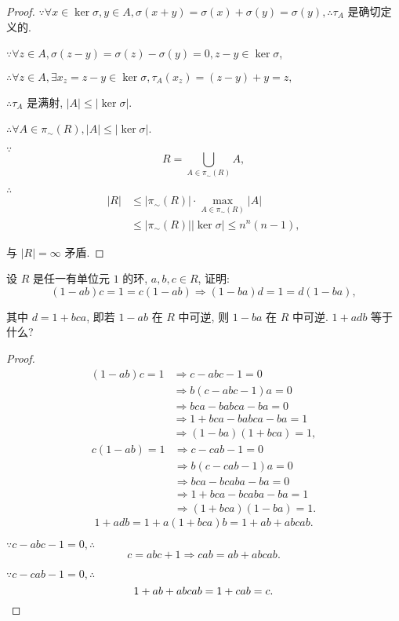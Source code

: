 \documentclass{ctexart}
\begin{document}
\begin{proof}
    $\because\forall x\in\ker\sigma,y\in A,\sigma(x+y)=\sigma(x)+\sigma(y)=\sigma(y),\therefore\tau_A$ 是确切定义的.

    $\because\forall z\in A,\sigma(z-y)=\sigma(z)-\sigma(y)=0,z-y\in\ker\sigma$,

    $\therefore\forall z\in A,\exists x_z=z-y\in\ker\sigma,\tau_A(x_z)=(z-y)+y=z,$

    $\therefore\tau_A$ 是满射, $|A|\leq|\ker\sigma|$.

    $\therefore\forall A\in\pi_\sim(R),|A|\leq|\ker\sigma|$.

    $\because$
    \[R=\bigcup\limits_{A\in\pi_\sim(R)}A,\]

    $\therefore$
    \begin{align*}
        |R| & \leq|\pi_\sim(R)|\cdot\max\limits_{A\in\pi_\sim(R)}|A| \\
        & \leq|\pi_\sim(R)||\ker\sigma|\leq n^n(n-1),
    \end{align*}

    与 $|R|=\infty$ 矛盾.
\end{proof}
\begin{exercise}[3.10]
    设 $R$ 是任一有单位元 $1$ 的环, $a,b,c\in R$, 证明:
    \[(1-ab)c=1=c(1-ab)\Rightarrow(1-ba)d=1=d(1-ba),\]

    其中 $d=1+bca$, 即若 $1-ab$ 在 $R$ 中可逆, 则 $1-ba$ 在 $R$ 中可逆. $1+adb$ 等于什么?
\end{exercise}
\begin{proof}
    \begin{align*}
        (1-ab)c=1 & \Rightarrow c-abc-1=0 \\
        & \Rightarrow b(c-abc-1)a=0 \\
        & \Rightarrow bca-babca-ba=0 \\
        & \Rightarrow 1+bca-babca-ba=1 \\
        & \Rightarrow (1-ba)(1+bca)=1,
    \end{align*}
    \begin{align*}
        c(1-ab)=1 & \Rightarrow c-cab-1=0 \\
        & \Rightarrow b(c-cab-1)a=0 \\
        & \Rightarrow bca-bcaba-ba=0 \\
        & \Rightarrow 1+bca-bcaba-ba=1 \\
        & \Rightarrow (1+bca)(1-ba)=1.
    \end{align*}
    \[1+adb=1+a(1+bca)b=1+ab+abcab.\]

    $\because c-abc-1=0,\therefore$
    \[c=abc+1\Rightarrow cab=ab+abcab.\]

    $\because c-cab-1=0,\therefore$
    \[1+ab+abcab=1+cab=c.\qedhere\]
\end{proof}
\end{document}
